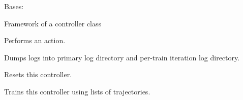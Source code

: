 \documentclass[letterpaper,10pt,english,openany,oneside]{sphinxmanual}
\begin{document}
\begin{fulllineitems}
\label{\detokenize{_modules/controllers:controllers.Controller.Controller}}
Bases: 

Framework of a controller class

\begin{fulllineitems}
\label{\detokenize{_modules/controllers:controllers.Controller.Controller.act}}
Performs an action.

\end{fulllineitems}


\begin{fulllineitems}
\label{\detokenize{_modules/controllers:controllers.Controller.Controller.dump_logs}}
Dumps logs into primary log directory and per-train iteration log directory.

\end{fulllineitems}


\begin{fulllineitems}
\label{\detokenize{_modules/controllers:controllers.Controller.Controller.reset}}
Resets this controller.

\end{fulllineitems}


\begin{fulllineitems}
\label{\detokenize{_modules/controllers:controllers.Controller.Controller.train}}
Trains this controller using lists of trajectories.

\end{fulllineitems}


\end{fulllineitems}
\end{document}
